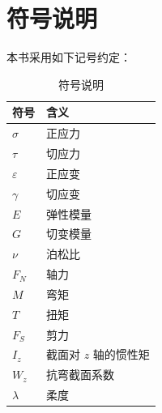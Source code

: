 \section{符号说明}
\label{sec:符号说明}

本书采用如下记号约定：

\begin{table}[H]
\centering
\caption{符号说明}
\label{tab:符号说明}
\begin{tabular}{ll}
\toprule
符号 & 含义 \\
\midrule
$\sigma$ & 正应力 \\
$\tau$ & 切应力 \\
$\varepsilon$ & 正应变 \\
$\gamma$ & 切应变 \\
$E$ & 弹性模量 \\
$G$ & 切变模量 \\
$\nu$ & 泊松比 \\
$F_N$ & 轴力 \\
$M$ & 弯矩 \\
$T$ & 扭矩 \\
$F_S$ & 剪力 \\
$I_z$ & 截面对 $z$ 轴的惯性矩 \\
$W_z$ & 抗弯截面系数 \\
$\lambda$ & 柔度 \\
\bottomrule
\end{tabular}
\end{table}
